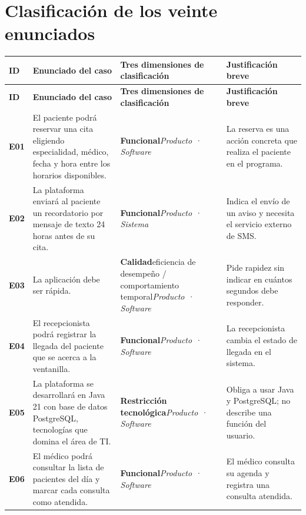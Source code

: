 \documentclass[10pt,a4paper,onecolumn]{IEEEtran}
\begin{document}
\section{Clasificación de los veinte enunciados}
\small
\begin{longtable}{@{}>{\raggedright\arraybackslash}p{.8cm}>{\raggedright\arraybackslash}p{5.25cm}>{\raggedright\arraybackslash}p{4.55cm}>{\raggedright\arraybackslash}p{4.55cm}@{}}
\toprule
\textbf{ID}&\textbf{Enunciado del caso}&\textbf{Tres dimensiones de clasificación}&\textbf{Justificación breve}\tabularnewline\midrule
\endfirsthead
\toprule
\textbf{ID}&\textbf{Enunciado del caso}&\textbf{Tres dimensiones de clasificación}&\textbf{Justificación breve}\tabularnewline\midrule
\endhead
\bottomrule
\endfoot
\textbf{E01} & El paciente podrá reservar una cita eligiendo especialidad, médico, fecha y hora entre los horarios disponibles. & \textbf{Funcional}\newline \emph{Producto · Software} & La reserva es una acción concreta que realiza el paciente en el programa. \\ \midrule
\textbf{E02} & La plataforma enviará al paciente un recordatorio por mensaje de texto 24 horas antes de su cita. & \textbf{Funcional}\newline \emph{Producto · Sistema} & Indica el envío de un aviso y necesita el servicio externo de SMS. \\ \midrule
\textbf{E03} & La aplicación debe ser rápida. & \textbf{Calidad}\newline eficiencia de desempeño / comportamiento temporal\newline \emph{Producto · Software} & Pide rapidez sin indicar en cuántos segundos debe responder. \\ \midrule
\textbf{E04} & El recepcionista podrá registrar la llegada del paciente que se acerca a la ventanilla. & \textbf{Funcional}\newline \emph{Producto · Software} & La recepcionista cambia el estado de llegada en el sistema. \\ \midrule
\textbf{E05} & La plataforma se desarrollará en Java 21 con base de datos PostgreSQL, tecnologías que domina el área de TI. & \textbf{Restricción tecnológica}\newline \emph{Producto · Software} & Obliga a usar Java y PostgreSQL; no describe una función del usuario. \\ \midrule
\textbf{E06} & El médico podrá consultar la lista de pacientes del día y marcar cada consulta como atendida. & \textbf{Funcional}\newline \emph{Producto · Software} & El médico consulta su agenda y registra una consulta atendida. \\ \midrule

\end{longtable}
\end{document}
